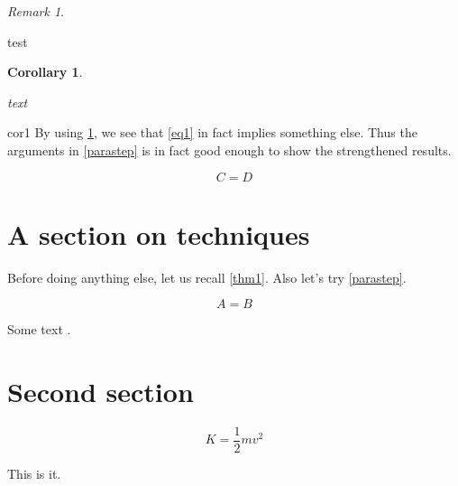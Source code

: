 \documentclass[amssymb,amsfonts]{amsart}
\theoremstyle{plain} %
\newtheorem{cor}[thm]{Corollary}
\theoremstyle{definition} %
\theoremstyle{remark} %
\newtheorem{rmk}[thm]{Remark}
\begin{document}
\begin{rmk}\label{rmk1}
	\lipsum[27]

	test
\end{rmk}

\begin{cor}\label{cor1}
	\lipsum[24]

	text
\end{cor}

\begin{pfof}{cor1}
	By using \ref{rmk1}, we see that \ref{eq1} in fact implies something else. Thus the arguments in \ref{parastep} is in fact good enough to show the strengthened results. 
\end{pfof}

\begin{equation}
	C = D
\end{equation}

\section{A section on techniques}

Before doing anything else, let us recall \ref{thm1}. Also let's try \ref{parastep}.

\lipsum[2]

\begin{equation}
	A = B
\end{equation}

\lipsum[3-8]




\lipsum[5-9]

Some text \cite{Wong2009}.


\section{Second section}


\lipsum[10-23]

\begin{equation}
K = \frac12 mv^2
\end{equation}

This is it.


%
%
\end{document}
